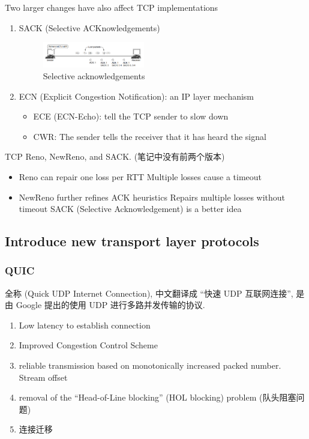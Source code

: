 Two larger changes have also affect TCP implementations
\begin{enumerate}
    \item SACK (Selective ACKnowledgements) 
    \begin{figure}[!htb]
        \centering
        \includegraphics[width=0.42\textwidth]{pic/CN6/Selective acknowledgements}
        \caption{Selective acknowledgements}
    \end{figure}
    \item ECN (Explicit Congestion Notification): an IP layer mechanism
    \begin{itemize}
        \item ECE (ECN-Echo): tell the TCP sender to slow down
        \item CWR: The sender tells the receiver that it has heard the signal
    \end{itemize}
\end{enumerate}

TCP Reno, NewReno, and SACK. (笔记中没有前两个版本)
\begin{itemize}\scriptsize
    \item Reno can repair one loss per RTT
    \subitem Multiple losses cause a timeout
    \item NewReno further refines ACK heuristics
    \subitem Repairs multiple losses without timeout
    \subitem SACK (Selective Acknowledgement) is a better idea
\end{itemize}

\subsection{Introduce new transport layer protocols}
\subsubsection{QUIC} 
全称 (Quick UDP Internet Connection), 中文翻译成 ``快速 UDP 互联网连接'', 是由 Google 提出的使用 UDP 进行多路并发传输的协议. 


\begin{enumerate}
    \item Low latency to establish connection
    \item Improved Congestion Control Scheme
    \item reliable transmission based on monotonically increased packed number. 
    \subitem Stream offset
    \item removal of the ``Head-of-Line blocking'' (HOL blocking) problem (队头阻塞问题)
    \item 连接迁移
\end{enumerate}

